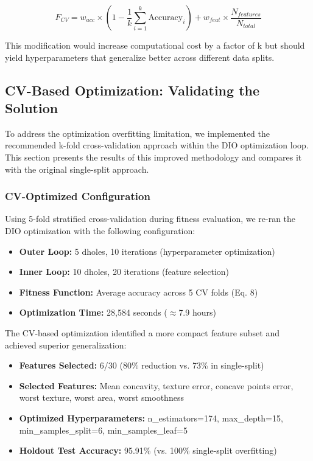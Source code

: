 \documentclass[12pt, a4paper]{article}
\begin{document}
\begin{equation}
    F_{CV} = w_{acc} \times \left(1 - \frac{1}{k}\sum_{i=1}^{k} \text{Accuracy}_i\right) + w_{feat} \times \frac{N_{features}}{N_{total}}
\end{equation}

This modification would increase computational cost by a factor of k but should yield hyperparameters that generalize better across different data splits.

\subsection{CV-Based Optimization: Validating the Solution}
To address the optimization overfitting limitation, we implemented the recommended k-fold cross-validation approach within the DIO optimization loop. This section presents the results of this improved methodology and compares it with the original single-split approach.

\subsubsection{CV-Optimized Configuration}
Using 5-fold stratified cross-validation during fitness evaluation, we re-ran the DIO optimization with the following configuration:
\begin{itemize}
    \item \textbf{Outer Loop:} 5 dholes, 10 iterations (hyperparameter optimization)
    \item \textbf{Inner Loop:} 10 dholes, 20 iterations (feature selection)
    \item \textbf{Fitness Function:} Average accuracy across 5 CV folds (Eq. 8)
    \item \textbf{Optimization Time:} 28,584 seconds ($\approx$7.9 hours)
\end{itemize}

The CV-based optimization identified a more compact feature subset and achieved superior generalization:
\begin{itemize}
    \item \textbf{Features Selected:} 6/30 (80\% reduction vs. 73\% in single-split)
    \item \textbf{Selected Features:} Mean concavity, texture error, concave points error, worst texture, worst area, worst smoothness
    \item \textbf{Optimized Hyperparameters:} n\_estimators=174, max\_depth=15, min\_samples\_split=6, min\_samples\_leaf=5
    \item \textbf{Holdout Test Accuracy:} 95.91\% (vs. 100\% single-split overfitting)
\end{itemize}
\end{document}
